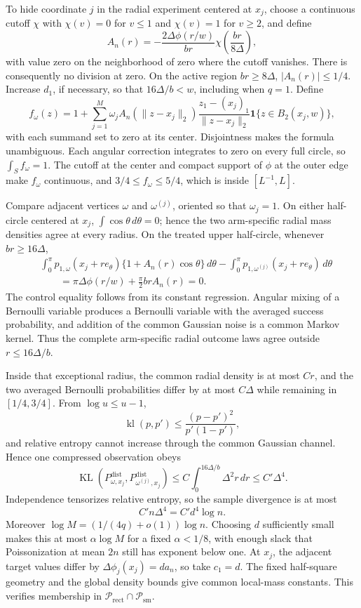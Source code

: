 To hide coordinate \(j\) in the radial experiment centered at \(x_j\), choose a continuous cutoff \(\chi\) with \(\chi(v)=0\) for \(v\leq1\) and \(\chi(v)=1\) for \(v\geq2\), and define
\[
 A_n(r)=-\frac{2\Delta\phi(r/w)}{br}
 \chi\!\left(\frac{br}{8\Delta}\right),
\]
with value zero on the neighborhood of zero where the cutoff vanishes.  There is consequently no division at zero.  On the active region \(br\geq8\Delta\), \(|A_n(r)|\leq1/4\).  Increase \(d_1\), if necessary, so that \(16\Delta/b<w\), including when \(q=1\).  Define
\[
 f_\omega(z)=1+\sum_{j=1}^M\omega_jA_n(\lVert z-x_j\rVert_2)
 \frac{z_1-(x_j)_1}{\lVert z-x_j\rVert_2}
 \mathbf1\{z\in B_2(x_j,w)\},
\]
with each summand set to zero at its center.  Disjointness makes the formula unambiguous.  Each angular correction integrates to zero on every full circle, so \(\int_Sf_\omega=1\).  The cutoff at the center and compact support of \(\phi\) at the outer edge make \(f_\omega\) continuous, and \(3/4\leq f_\omega\leq5/4\), which is inside \([L^{-1},L]\).

Compare adjacent vertices \(\omega\) and \(\omega^{(j)}\), oriented so that \(\omega_j=1\).  On either half-circle centered at \(x_j\), \(\int\cos\theta\,d\theta=0\); hence the two arm-specific radial mass densities agree at every radius.  On the treated upper half-circle, whenever \(br\geq16\Delta\),
\[
\begin{aligned}
 &\int_0^\pi p_{1,\omega}(x_j+r e_\theta)
       \{1+A_n(r)\cos\theta\}\,d\theta
 -\int_0^\pi p_{1,\omega^{(j)}}(x_j+r e_\theta)\,d\theta\\
 &\qquad=\pi\Delta\phi(r/w)+\frac\pi2brA_n(r)=0.
\end{aligned}
\]
The control equality follows from its constant regression.  Angular mixing of a Bernoulli variable produces a Bernoulli variable with the averaged success probability, and addition of the common Gaussian noise is a common Markov kernel.  Thus the complete arm-specific radial outcome laws agree outside \(r\leq16\Delta/b\).

Inside that exceptional radius, the common radial density is at most \(Cr\), and the two averaged Bernoulli probabilities differ by at most \(C\Delta\) while remaining in \([1/4,3/4]\).  From \(\log u\leq u-1\),
\[
 \operatorname{kl}(p,p')\leq\frac{(p-p')^2}{p'(1-p')},
\]
and relative entropy cannot increase through the common Gaussian channel.  Hence one compressed observation obeys
\[
 \operatorname{KL}(P^{\mathrm{dist}}_{\omega,x_j},
 P^{\mathrm{dist}}_{\omega^{(j)},x_j})
 \leq C\int_0^{16\Delta/b}\Delta^2r\,dr
 \leq C'\Delta^4.
\]
Independence tensorizes relative entropy, so the sample divergence is at most
\[
 C'n\Delta^4=C'd^4\log n.
\]
Moreover \(\log M=(1/(4q)+o(1))\log n\).  Choosing \(d\) sufficiently small makes this at most \(\alpha\log M\) for a fixed \(\alpha<1/8\), with enough slack that Poissonization at mean \(2n\) still has exponent below one.  At \(x_j\), the adjacent target values differ by \(\Delta\phi_j(x_j)=d a_n\), so take \(c_1=d\).  The fixed half-square geometry and the global density bounds give common local-mass constants.  This verifies membership in \(\mathcal P_{\mathrm{rect}}\cap\mathcal P_{\mathrm{sm}}\).

